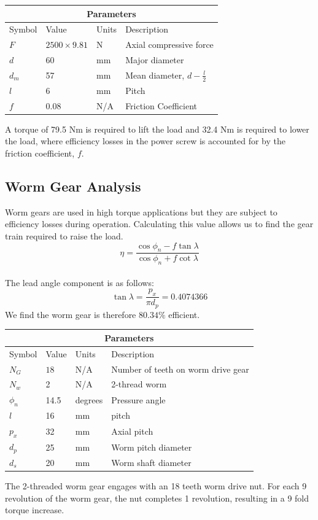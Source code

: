 \documentclass[letterpaper,12pt]{article}
\begin{document}
\begin{center}
	\begin{tabular}{ |p{2cm}||p{3cm}|p{2cm}|p{7cm}|  }
		\hline
		\multicolumn{4}{|c|}{Parameters} \\
		\hline
		Symbol& Value & Units & Description\\
		\hline
		$F$ & $2500 \times 9.81$ & N & Axial compressive force\\
        $d$ & 60 & mm   & Major diameter\\			
		$d_m$ & 57 & mm   & Mean diameter, $d - \frac{l}{2}$\\
		$l$ & 6 & mm &  Pitch\\
		$f$ & 0.08 & N/A & Friction Coefficient\\
		\hline
	\end{tabular}
\end{center}

A torque of 79.5 Nm is required to lift the load and 32.4 Nm is required to lower the load, where efficiency losses in the power screw is accounted for by the friction coefficient, $f$. 
    
\subsection{Worm Gear Analysis}
Worm gears are used in high torque applications but they are subject to efficiency losses during operation. Calculating this value allows us to find the gear train required to raise the load. \\

	\begin{equation}
	\eta = \frac{\cos\phi_n - f\tan\lambda}{\cos\phi_n+f\cot\lambda}
	\end{equation}
\\	
The lead angle component is as follows:
	\begin{equation}
\tan \lambda =  \frac{p_x}{\pi d_p} = 0.4074366
	\end{equation}
We find the worm gear is therefore $80.34 \% $ efficient.
\begin{center}
		\begin{tabular}{ |p{2cm}||p{3cm}|p{2cm}|p{7cm}|  }
			\hline
			\multicolumn{4}{|c|}{Parameters} \\
			\hline
			Symbol& Value & Units & Description\\
			\hline
			$N_G$ & $18$ & N/A & Number of teeth on worm drive gear\\
			$N_w$ & 2 & N/A   & 2-thread worm \\
			$\phi_n$ & 14.5 & degrees &  Pressure angle\\
			$l$ & 16 & mm & pitch\\
			$p_x$ & 32 & mm & Axial pitch\\
			$d_p$ & 25 & mm & Worm pitch diameter\\
			$d_s$ & 20 & mm & Worm shaft diameter\\
			\hline
		\end{tabular}
	\end{center}
The 2-threaded worm gear engages with an 18 teeth worm drive nut. For each 9 revolution of the worm gear, the nut completes 1 revolution, resulting in a 9 fold torque increase. 
\end{document}
